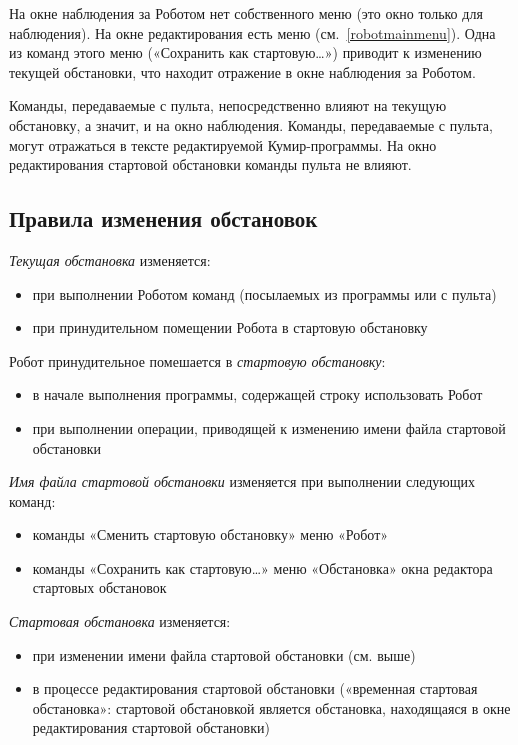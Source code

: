 На окне наблюдения за Роботом нет собственного меню (это окно только для наблюдения). На окне редактирования есть меню (см.~\ref{robotmainmenu}). Одна из команд этого меню («Сохранить как стартовую\dots») приводит к изменению текущей обстановки, что находит отражение в окне наблюдения за Роботом. 

Команды, передаваемые с пульта, непосредственно влияют на текущую обстановку, а значит, и на окно наблюдения. Команды, передаваемые с пульта, могут отражаться в тексте редактируемой Кумир-программы. На окно редактирования стартовой обстановки команды пульта не влияют.

\subsection{Правила изменения обстановок}

\emph{Текущая обстановка} изменяется:
\begin{itemize}
\item при выполнении Роботом команд (посылаемых из программы или с пульта)
\item при принудительном помещении Робота в стартовую обстановку
\end{itemize}

Робот принудительное помешается в \emph{стартовую обстановку}:
\begin{itemize}
\item в начале выполнения программы, содержащей строку \textsf{использовать Робот}
\item при выполнении операции, приводящей к изменению имени файла стартовой обстановки
\end{itemize}

\emph{Имя файла стартовой обстановки} изменяется при выполнении следующих команд:
\begin{itemize}
\item команды  «Сменить стартовую обстановку» меню «Робот»
\item команды «Сохранить как стартовую\dots» меню «Обстановка» окна редактора стартовых обстановок
\end{itemize}

\emph{Стартовая обстановка} изменяется:
\begin{itemize}
\item при изменении имени файла стартовой обстановки (см. выше)
\item в процессе редактирования стартовой обстановки («временная стартовая обстановка»: стартовой обстановкой является обстановка, находящаяся в окне редактирования стартовой обстановки)
\end{itemize}
